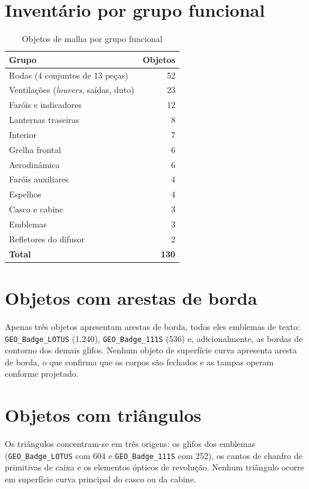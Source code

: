 \section{Invent\'ario por grupo funcional}

\begin{table}[htbp]
\centering
\caption{Objetos de malha por grupo funcional}
\label{tab:grupos-ap}
\footnotesize
\begin{tabular}{>{\raggedright\arraybackslash}p{7.0cm}r}
\toprule
\textbf{Grupo} & \textbf{Objetos} \\
\midrule
Rodas (4 conjuntos de 13 pe{\c{c}}as) & 52 \\
Ventila{\c{c}}\~oes (\emph{louvers}, sa\'idas, duto) & 23 \\
Far\'ois e indicadores & 12 \\
Lanternas traseiras & 8 \\
Interior & 7 \\
Grelha frontal & 6 \\
Aerodin\^amica & 6 \\
Far\'ois auxiliares & 4 \\
Espelhos & 4 \\
Casco e cabine & 3 \\
Emblemas & 3 \\
Refletores do difusor & 2 \\
\midrule
\textbf{Total} & \textbf{130} \\
\bottomrule
\end{tabular}
\end{table}

\section{Objetos com arestas de borda}

Apenas tr\^es objetos apresentam arestas de borda, todos eles emblemas de texto:
\texttt{GEO\_Badge\_}\allowbreak\texttt{LOTUS} (1.240),
\texttt{GEO\_Badge\_}\allowbreak\texttt{111S} (536) e, adicionalmente, as
bordas de contorno dos demais glifos. Nenhum objeto de superf\'icie curva apresenta aresta de
borda, o que confirma que os corpos s\~ao fechados e as tampas operam conforme projetado.

\section{Objetos com tri\^angulos}

Os tri\^angulos concentram-se em tr\^es origens: os glifos dos emblemas
(\texttt{GEO\_Badge\_}\allowbreak\texttt{LOTUS} com 604 e
\texttt{GEO\_Badge\_}\allowbreak\texttt{111S} com 252), os cantos de chanfro
de primitivas de caixa e os elementos \'opticos de revolu{\c{c}}\~ao. Nenhum tri\^angulo
ocorre em superf\'icie curva principal do casco ou da cabine.
